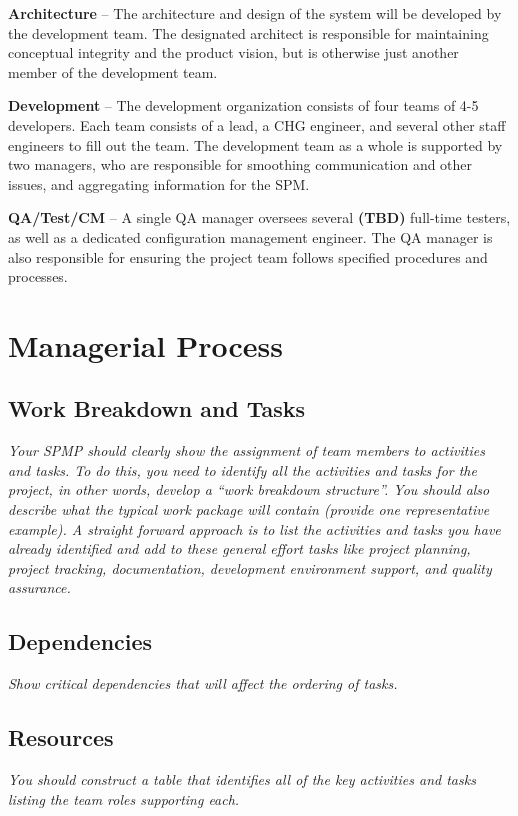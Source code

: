 \documentclass[11pt]{article}
\begin{document}
\textbf{Architecture} -- The architecture and design of the system will be developed by the development
team.  The designated architect is responsible for maintaining conceptual integrity and the product
vision, but is otherwise just another member of the development team.

\textbf{Development} -- The development organization consists of four teams of 4-5 developers.  Each
team consists of a lead, a CHG engineer, and several other staff engineers to fill out the team.
The development team as a whole is supported by two managers, who are responsible for smoothing
communication and other issues, and aggregating information for the SPM.

\textbf{QA/Test/CM} -- A single QA manager oversees several \textbf{(TBD)} full-time testers, as
well as a dedicated configuration management engineer.  The QA manager is also responsible for
ensuring the project team follows specified procedures and processes.



\section{Managerial Process}
\subsection{Work Breakdown and Tasks}
{\it Your SPMP should clearly show the assignment of team members to activities and tasks.  To do this,
you need to identify all the activities and tasks for the project, in other words, develop a “work
breakdown structure”.  You should also describe what the typical work package will contain (provide
one representative example).  A straight forward approach is to list the activities and tasks you
have already identified and add to these general effort tasks like project planning, project
tracking, documentation, development environment support, and quality assurance.}
\subsection{Dependencies}
{\it Show critical dependencies that will affect the ordering of tasks. }
\subsection{Resources}
{\it You should construct a table that identifies all of the key activities and tasks listing the team
roles supporting each.}
\end{document}
